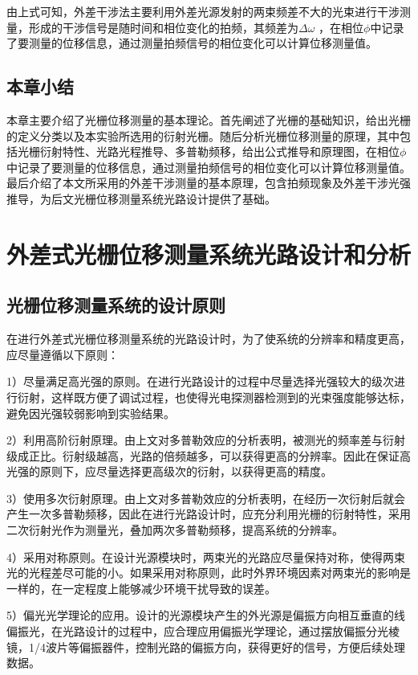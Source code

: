 \documentclass[type=master,oneside]{fduthesis}
\begin{document}
由上式可知，外差干涉法主要利用外差光源发射的两束频差不大的光束进行干涉测量，形成的干涉信号是随时间和相位变化的拍频，其频差为$\Delta \omega$ ，在相位$ \phi$中记录了要测量的位移信息，通过测量拍频信号的相位变化可以计算位移测量值。


\section{本章小结}
本章主要介绍了光栅位移测量的基本理论。首先阐述了光栅的基础知识，给出光栅的定义分类以及本实验所选用的衍射光栅。随后分析光栅位移测量的原理，其中包括光栅衍射特性、光路光程推导、多普勒频移，给出公式推导和原理图，在相位$ \phi$中记录了要测量的位移信息，通过测量拍频信号的相位变化可以计算位移测量值。最后介绍了本文所采用的外差干涉测量的基本原理，包含拍频现象及外差干涉光强推导，为后文光栅位移测量系统光路设计提供了基础。


\chapter{外差式光栅位移测量系统光路设计和分析}
\section{光栅位移测量系统的设计原则}
在进行外差式光栅位移测量系统的光路设计时，为了使系统的分辨率和精度更高，应尽量遵循以下原则：

1）尽量满足高光强的原则。在进行光路设计的过程中尽量选择光强较大的级次进行衍射，这样既方便了调试过程，也使得光电探测器检测到的光束强度能够达标，避免因光强较弱影响到实验结果。

2）利用高阶衍射原理。由上文对多普勒效应的分析表明，被测光的频率差与衍射级成正比。衍射级越高，光路的倍频越多，可以获得更高的分辨率。因此在保证高光强的原则下，应尽量选择更高级次的衍射，以获得更高的精度。

3）使用多次衍射原理。由上文对多普勒效应的分析表明，在经历一次衍射后就会产生一次多普勒频移，因此在进行光路设计时，应充分利用光栅的衍射特性，采用二次衍射光作为测量光，叠加两次多普勒频移，提高系统的分辨率。

4）采用对称原则。在设计光源模块时，两束光的光路应尽量保持对称，使得两束光的光程差尽可能的小。如果采用对称原则，此时外界环境因素对两束光的影响是一样的，在一定程度上能够减少环境干扰导致的误差。

5）偏光光学理论的应用。设计的光源模块产生的外光源是偏振方向相互垂直的线偏振光，在光路设计的过程中，应合理应用偏振光学理论，通过摆放偏振分光棱镜，1/4波片等偏振器件，控制光路的偏振方向，获得更好的信号，方便后续处理数据。
\end{document}
